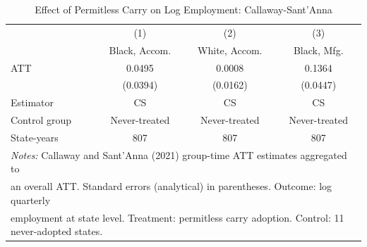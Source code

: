 \begin{table}[t]
\centering
\caption{Effect of Permitless Carry on Log Employment: Callaway-Sant'Anna}
\label{tab:main}
\begin{tabular}{lccc}
\hline\hline
 & (1) & (2) & (3) \\
 & Black, Accom. & White, Accom. & Black, Mfg. \\
\hline
ATT & 0.0495 & 0.0008 & 0.1364 \\
 & (0.0394) & (0.0162) & (0.0447) \\
\hline
Estimator & CS & CS & CS \\
Control group & Never-treated & Never-treated & Never-treated \\
State-years & 807 & 807 & 807 \\
\hline
\multicolumn{4}{l}{\footnotesize \textit{Notes:} Callaway and Sant'Anna (2021) group-time ATT estimates aggregated to} \\
\multicolumn{4}{l}{\footnotesize an overall ATT. Standard errors (analytical) in parentheses. Outcome: log quarterly} \\
\multicolumn{4}{l}{\footnotesize employment at state level. Treatment: permitless carry adoption. Control: 11 never-adopted states.} \\
\hline\hline
\end{tabular}
\end{table}

